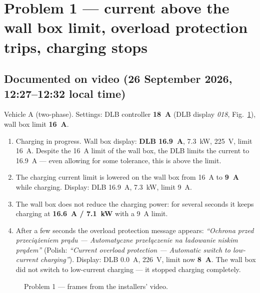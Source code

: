 \documentclass[11pt,a4paper]{article}
\begin{document}
\section{Problem 1 — current above the wall box limit, overload protection trips, charging stops}

\subsection{Documented on video (26 September 2026, 12:27–12:32 local time)}

Vehicle A (two-phase). Settings: DLB controller \textbf{18~A} (DLB display \emph{018}, Fig.~\ref{fig:p1}), wall box limit \textbf{16~A}.

\begin{enumerate}[leftmargin=2.2em]
\item {} Charging in progress. Wall box display: \textbf{DLB 16.9~A}, 7.3~kW, 225~V, limit 16~A. Despite the 16~A limit of the wall box, the DLB limits the current to 16.9~A — even allowing for some tolerance, this is above the limit.
\item {} The charging current limit is lowered on the wall box from 16~A to \textbf{9~A} while charging. Display: DLB 16.9~A, 7.3~kW, limit 9~A.
\item {} The wall box does not reduce the charging power: for several seconds it keeps charging at \textbf{16.6~A / 7.1~kW} with a 9~A limit.
\item {} After a few seconds the overload protection message appears: \emph{``Ochrona przed przeciążeniem prądu — Automatyczne przełączenie na ładowanie niskim prądem''} (Polish: \emph{``Current overload protection — Automatic switch to low-current charging''}). Display: DLB 0.0~A, 226~V, limit now \textbf{8~A}. The wall box did not switch to low-current charging — it stopped charging completely.
\end{enumerate}

\begin{figure}[H]
\centering
{}\hfill
{}\hfill
{}\hfill
{}\hfill
{}
\caption{Problem 1 — frames from the installers' video.}
\label{fig:p1}
\end{figure}
\end{document}
